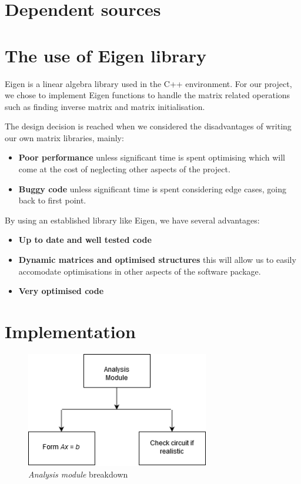 \documentclass[a4paper, titlepage]{article}
\begin{document}
    \section{Dependent sources}
    \pagebreak

    \section{The use of Eigen library}
    Eigen is a linear algebra library used in the C++ environment. For our project, we chose to implement 
    Eigen functions to handle the matrix related operations such as finding inverse matrix 
    and matrix initialisation.
    \par
    The design decision is reached when we considered
    the disadvantages of writing our own matrix libraries, mainly:
    \begin{itemize}
        \item \textbf{Poor performance} unless significant time is spent optimising which will come at the cost of
        neglecting other aspects of the project.
        \item \textbf{Buggy code} unless significant time is spent considering edge cases, going back to first point.
    \end{itemize}
    By using an established library like Eigen, we have several advantages:
    \begin{itemize}
        \item \textbf{Up to date and well tested code}
        \item \textbf{Dynamic matrices and optimised structures} this will allow us to easily accomodate  
        optimisations in other aspects of the software package.
        \item \textbf{Very optimised code}

    \end{itemize}
    \pagebreak    

    \section{Implementation}
    \begin{figure}[htp]
        \centering
        \includegraphics[width=80mm,scale=1]{Analysis breakdown}
        \caption{\textit{Analysis module} breakdown}
        \label{fig:figure3}
    \end{figure}
\end{document}
